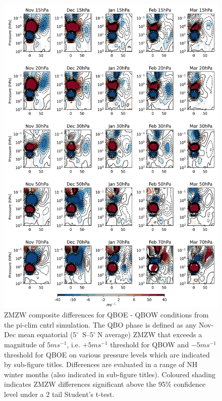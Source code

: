 \newpage
\begin{figure}[h!]
\begin{center}
\noindent\includegraphics[width = 0.82\linewidth]{Figures/Figures-deepQBO/ZMZW_composites_by_month_QBO_phases_U_piclim_MarQBO_vs_Mar_70hPa_5thresh.png}
\caption[ZMZW composites under QBO phases in the pi-clim cntrl simulation]{ZMZW composite differences for QBOE - QBOW conditions from the pi-clim cntrl simulation. The QBO phase is defined as any Nov-Dec mean equatorial ($5^{\circ}$\ S--$5^{\circ}\ $N average) ZMZW that exceeds a magnitude of $5 ms^{-1}$, i.e. $+5 ms^{-1}$ threshold for QBOW and $-5 ms^{-1}$ threshold for QBOE on various pressure levels which are indicated by sub-figure titles. Differences are evaluated in a range of NH winter months (also indicated in sub-figure titles). Coloured shading indicates ZMZW differences significant above the 95\% confidence level under a 2 tail Student’s t-test.}
\label{fig:HT_piclim}
\end{center}
\end{figure}
\newpage
